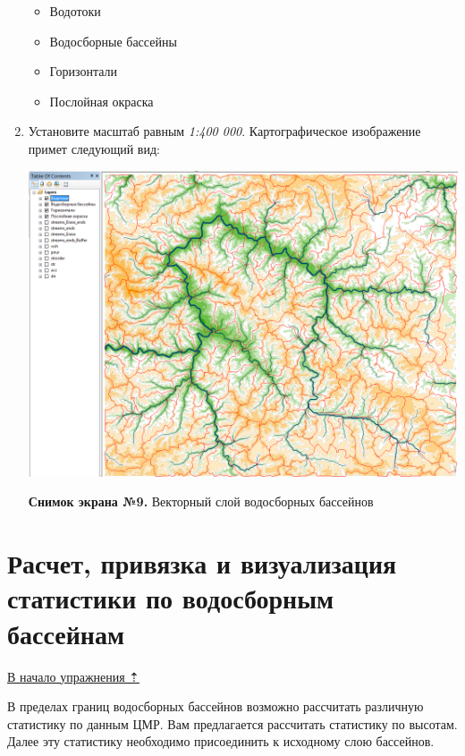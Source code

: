 \documentclass[]{book}
\providecommand{\tightlist}{%
  \setlength{\itemsep}{0pt}\setlength{\parskip}{0pt}}
\theoremstyle{definition}
\theoremstyle{definition}
\theoremstyle{definition}
\theoremstyle{remark}
\begin{document}
\begin{enumerate}
  \begin{itemize}
  \tightlist
  \item
    Водотоки
  \item
    Водосборные бассейны
  \item
    Горизонтали
  \item
    Послойная окраска
  \end{itemize}
\item
  Установите масштаб равным \emph{1:400 000}. Картографическое
  изображение примет следующий вид:

  \includegraphics{images/Ex15/image25.png}

  \textbf{Снимок экрана №9.} Векторный слой водосборных бассейнов
\end{enumerate}

\hypertarget{dem-statistics}{%
\section{Расчет, привязка и визуализация статистики по водосборным
бассейнам}\label{dem-statistics}}

\protect\hyperlink{dem}{В начало упражнения ⇡}

В пределах границ водосборных бассейнов возможно рассчитать различную
статистику по данным ЦМР. Вам предлагается рассчитать статистику по
высотам. Далее эту статистику необходимо присоединить к исходному слою
бассейнов.
\end{document}
